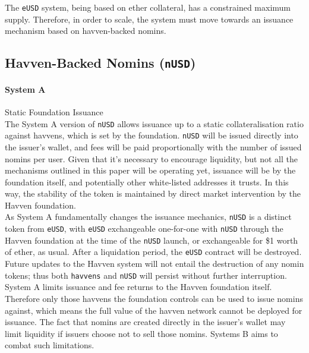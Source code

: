 \noindent The \texttt{eUSD} system, being based on ether collateral, has a constrained maximum supply.
Therefore, in order to scale, the system must move towards an issuance mechanism based on havven-backed
nomins.


\subsection{Havven-Backed Nomins (\texttt{nUSD})}

\paragraph{System A} Static Foundation Issuance \\

\noindent The System A version of \texttt{nUSD} allows issuance up to a static
collateralisation ratio against havvens, which is set by the foundation.
\texttt{nUSD} will be issued directly into the issuer's wallet, and fees will be paid
proportionally with the number of issued nomins per user. Given that it's necessary to
encourage liquidity, but not all the mechanisms outlined in this paper will be operating
yet, issuance will be by the foundation itself, and potentially other white-listed
addresses it trusts. In this way, the stability of the token is maintained by direct
market intervention by the Havven foundation. \\

\noindent As System A fundamentally changes the issuance mechanics, \texttt{nUSD} is a distinct
token from \texttt{eUSD}, with \texttt{eUSD} exchangeable one-for-one with \texttt{nUSD}
through the Havven foundation at the time of the \texttt{nUSD} launch, or exchangeable
for \$1 worth of ether, as usual. After a liquidation period, the \texttt{eUSD} contract
will be destroyed.
Future updates to the Havven system will not entail the destruction of any nomin tokens; thus
both \texttt{havvens} and \texttt{nUSD} will persist without further interruption. \\

\noindent System A limits issuance and fee returns to the Havven foundation itself. Therefore
only those havvens the foundation controls can be used to issue nomins against, which means
the full value of the havven network cannot be deployed for issuance. The fact that nomins
are created directly in the issuer's wallet may limit liquidity if issuers choose not to sell
those nomins. Systems B aims to combat such limitations. \\


